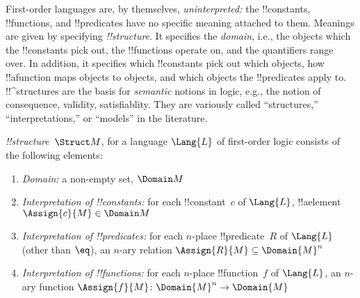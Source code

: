 \documentclass[../../include/open-logic-section]{subfiles}
\begin{document}


\begin{explain}
First-order languages are, by themselves, \emph{uninterpreted:} the
!!{constant}s, !!{function}s, and !!{predicate}s have no specific
meaning attached to them.  Meanings are given by specifying
 \emph{!!{structure}}. It specifies the
\emph{domain}, i.e., the objects which the !!{constant}s pick out, the
!!{function}s operate on, and the quantifiers range over. In addition,
it specifies which !!{constant}s pick out which objects, how
!!a{function} maps objects to objects, and which objects the
!!{predicate}s apply to.  !!^{structure}s are the basis for
\emph{semantic} notions in logic, e.g., the notion of consequence,
validity, satisfiablity. They are variously called ``structures,''
``interpretations,'' or ``models'' in the literature.
\end{explain}

\begin{defn}[!!^{structure}s]
 \emph{!!{structure}}~$\Struct M$, for a language
$\Lang{L}$ of first-order logic consists of the following elements:
\begin{enumerate}
\item \emph{Domain:} a non-empty set, $\Domain M$ 
\item \emph{Interpretation of !!{constant}s:} for each !!{constant}~$c$ of
  $\Lang{L}$, !!a{element} $\Assign{c}{M} \in \Domain M$
\item \emph{Interpretation of !!{predicate}s:} for each $n$-place
  !!{predicate}~$R$ of $\Lang{L}$ (other than $\eq$), an $n$-ary
  relation $\Assign{R}{M} \subseteq \Domain{M}^n$
\item \emph{Interpretation of !!{function}s:} for each $n$-place
  !!{function}~$f$ of $\Lang{L}$, an $n$-ary function $\Assign{f}{M}
  \colon \Domain{M}^n \to \Domain{M}$
\end{enumerate}
\end{defn}
\end{document}
